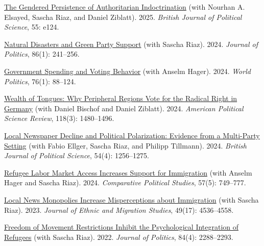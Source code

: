 \documentclass[letterpaper, 10pt]{article}
\newif\ifjobmarket
\begin{document}
\begin{etaremune}
  \item \href{https://www.cambridge.org/core/journals/british-journal-of-political-science/article/gendered-persistence-of-authoritarian-indoctrination/9FF7C98DA109B0A7E31521974A2B82FB}{The Gendered Persistence of Authoritarian Indoctrination} (with Nourhan A. Elsayed, Sascha Riaz, and Daniel Ziblatt). 2025. \textit{British Journal of Political Science}, 55: e124.
  \item \href{https://www.journals.uchicago.edu/doi/abs/10.1086/726917}{Natural Disasters and Green Party Support} (with Sascha Riaz). 2024. \textit{Journal of Politics}, 86(1): 241--256.\ifjobmarket \\
  \textit{Media coverage:} \href{https://www.bloomberg.com/news/articles/2024-09-16/surviving-a-climate-disaster-isn-t-likely-to-change-how-you-vote}{Bloomberg} and \href{https://www.handelsblatt.com/politik/deutschland/klimakrise-warum-hochwasser-den-gruenen-keine-neuen-stimmen-bringt/100069856.html}{Handelsblatt}.\fi
  \item \href{https://muse.jhu.edu/pub/1/article/916342}{Government Spending and Voting Behavior} (with Anselm Hager). 2024. \textit{World Politics}, 76(1): 88--124.
  \item \href{https://doi.org/10.1017/S0003055423000862}{Wealth of Tongues: Why Peripheral Regions Vote for the Radical Right in Germany} (with Daniel Bischof and Daniel Ziblatt). 2024. \textit{American Political Science Review}, 118(3): 1480--1496.
  \item \href{https://doi.org/10.1017/S0007123424000243}{Local Newspaper Decline and Political Polarization: Evidence from a Multi-Party Setting} (with Fabio Ellger, Sascha Riaz, and Philipp Tillmann). 2024. \textit{British Journal of Political Science}, 54(4): 1256--1275.
  \item \href{https://journals.sagepub.com/doi/abs/10.1177/00104140231178733}{Refugee Labor Market Access Increases Support for Immigration} (with Anselm Hager and Sascha Riaz). 2024. \textit{Comparative Political Studies}, 57(5): 749--777.
  \item \href{https://www.tandfonline.com/doi/full/10.1080/1369183X.2023.2173159}{Local News Monopolies Increase Misperceptions about Immigration} (with Sascha Riaz). 2023. \textit{Journal of Ethnic and Migration Studies}, 49(17): 4536--4558.
  \item \href{https://www.journals.uchicago.edu/doi/10.1086/720307}{Freedom of Movement Restrictions Inhibit the Psychological Integration of Refugees} (with Sascha Riaz). 2022. \textit{Journal of Politics}, 84(4): 2288--2293.

\end{etaremune}
\end{document}
